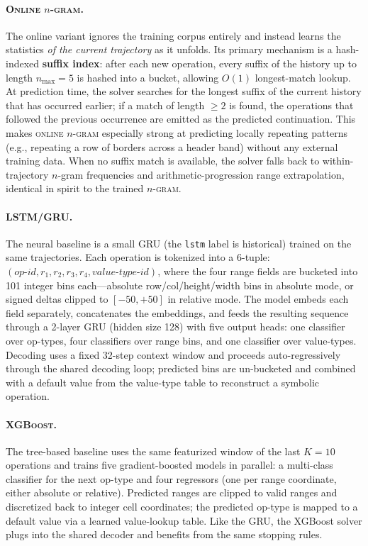 \documentclass{article}
\theoremstyle{plain}
\theoremstyle{definition}
\theoremstyle{remark}
\begin{document}
\paragraph{\textsc{Online $n$-gram}.}
The online variant ignores the training corpus entirely and instead learns the statistics \emph{of the current trajectory} as it unfolds.
Its primary mechanism is a hash-indexed \textbf{suffix index}: after each new operation, every suffix of the history up to length $n_{\max}{=}5$ is hashed into a bucket, allowing $O(1)$ longest-match lookup.
At prediction time, the solver searches for the longest suffix of the current history that has occurred earlier; if a match of length $\geq 2$ is found, the operations that followed the previous occurrence are emitted as the predicted continuation.
This makes \textsc{online $n$-gram} especially strong at predicting locally repeating patterns (e.g., repeating a row of borders across a header band) without any external training data.
When no suffix match is available, the solver falls back to within-trajectory $n$-gram frequencies and arithmetic-progression range extrapolation, identical in spirit to the trained \textsc{$n$-gram}.

\paragraph{\textsc{LSTM/GRU}.}
The neural baseline is a small GRU (the \texttt{lstm} label is historical) trained on the same trajectories.
Each operation is tokenized into a 6-tuple: $(\textit{op-id}, r_1, r_2, r_3, r_4, \textit{value-type-id})$, where the four range fields are bucketed into 101 integer bins each---absolute row/col/height/width bins in absolute mode, or signed deltas clipped to $[-50, +50]$ in relative mode.
The model embeds each field separately, concatenates the embeddings, and feeds the resulting sequence through a 2-layer GRU (hidden size 128) with five output heads: one classifier over op-types, four classifiers over range bins, and one classifier over value-types.
Decoding uses a fixed 32-step context window and proceeds auto-regressively through the shared decoding loop; predicted bins are un-bucketed and combined with a default value from the value-type table to reconstruct a symbolic operation.

\paragraph{\textsc{XGBoost}.}
The tree-based baseline uses the same featurized window of the last $K{=}10$ operations and trains five gradient-boosted models in parallel: a multi-class classifier for the next op-type and four regressors (one per range coordinate, either absolute or relative).
Predicted ranges are clipped to valid ranges and discretized back to integer cell coordinates; the predicted op-type is mapped to a default value via a learned value-lookup table.
Like the GRU, the XGBoost solver plugs into the shared decoder and benefits from the same stopping rules.
\end{document}
